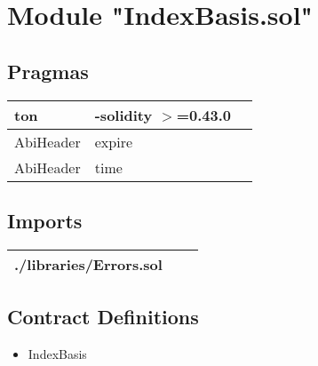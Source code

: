 
\section{Module "IndexBasis.sol"}


\subsection{Pragmas}


\noindent\begin{tabular}{|l|l|p{5cm}|}\hline
ton & -solidity $>$=0.43.0 &\\\hline
AbiHeader &  expire &\\\hline
AbiHeader &  time &\\\hline
\end{tabular}


\subsection{Imports}


\noindent\begin{tabular}{|l|l|p{5cm}|}\hline
./libraries/Errors.sol &\\\hline
\end{tabular}


\subsection{Contract Definitions}

\begin{itemize}
\item IndexBasis
\end{itemize}
